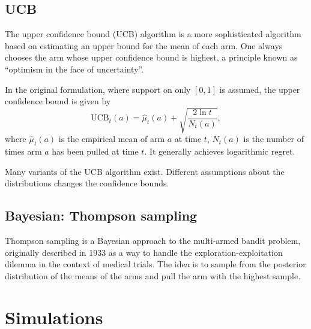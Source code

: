 \subsection{UCB}
The upper confidence bound (UCB) algorithm is a more sophisticated algorithm based on estimating an upper bound for the mean of each arm.
One always chooses the arm whose upper confidence bound is highest, a principle known as \enquote{optimism in the face of uncertainty}.

In the original formulation, where support on only $[0,1]$ is assumed, the upper confidence bound is given by
\begin{equation}
    \text{UCB}_t(a) = \hat{\mu}_t(a) + \sqrt{\frac{2\ln t}{N_t(a)}},
\end{equation}
where $\hat{\mu}_t(a)$ is the empirical mean of arm $a$ at time $t$, $N_t(a)$ is the number of times arm $a$ has been pulled at time $t$.
It generally achieves logarithmic regret.

Many variants of the UCB algorithm exist.
Different assumptions about the distributions changes the confidence bounds.

\subsection{Bayesian: Thompson sampling}
Thompson sampling is a Bayesian approach to the multi-armed bandit problem, originally described in 1933 as a way to handle the exploration-exploitation dilemma in the context of medical trials.
The idea is to sample from the posterior distribution of the means of the arms and pull the arm with the highest sample.


\section{Simulations}